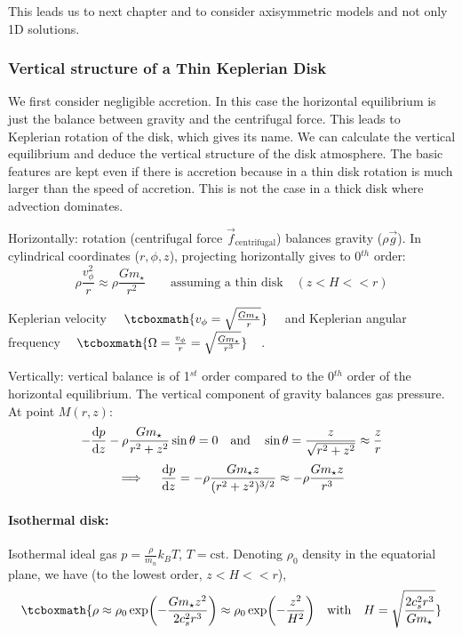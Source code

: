 \documentclass[10pt,a4paper,english]{article}
\let\originalleft\left
\let\originalright\right
\renewcommand{\left}{\mathopen{}\mathclose\bgroup\originalleft}
\renewcommand{\right}{\aftergroup\egroup\originalright}
\begin{document}
This leads us to next chapter and to consider axisymmetric models and not only
1D solutions.

\subsubsection{Vertical structure of a Thin Keplerian Disk}
We first consider negligible accretion. In this case the horizontal equilibrium is just the balance between gravity and the centrifugal force. This leads to Keplerian rotation of the disk, which gives its name. We can calculate the vertical equilibrium and deduce the vertical structure of the disk atmosphere. The basic features are kept even if there is accretion because in a thin disk rotation is much larger than the speed of accretion. This is not the case in a thick disk where advection dominates.


Horizontally: rotation (centrifugal force $\vec{f}_{\text{centrifugal}}$) balances gravity ($\rho \vec{g}$). In cylindrical coordinates ($r, \phi, z$), projecting horizontally gives to 0$^{th}$ order:
\begin{equation}
	\rho \frac{v_\phi^2}{r}\approx \rho\frac{Gm_\star}{r^2} \qquad \text{assuming a thin disk} \quad (z<H<<r)
\end{equation}

Keplerian velocity $\quad\tcboxmath{v_\phi = \sqrt{\frac{Gm_\star}{r}}} \quad$ and Keplerian angular frequency $\quad\tcboxmath{\Omega = \frac{v_\phi}{r} = \sqrt{\frac{Gm_\star}{r^3}}} \quad$.

Vertically: vertical balance is of 1$^{st}$ order compared to the 0$^{th}$ order of the horizontal equilibrium. The vertical component of gravity balances gas pressure. At point $M(r,z)$:
\begin{equation}
-\frac{\mathrm{d} p}{\mathrm{d} z}-\rho \frac{Gm_\star}{r^2+z^2}\sin\theta = 0 \quad \text{and} \quad \sin\theta = \frac{z}{\sqrt{r^2+z^2}} \approx \frac{z}{r}
\end{equation}
\begin{equation}
\implies \quad \frac{\mathrm{d} p}{\mathrm{d} z} = -\rho \frac{G m_\star z}{(r^2+z^2)^{3/2}} \approx -\rho \frac{G m_\star z}{r^3}
\end{equation}

\paragraph{Isothermal disk:} Isothermal ideal gas $p=\frac{\rho}{m_n}k_B T$, $T=\text{cst}$. Denoting $\rho_0$ density in the equatorial plane, we have (to the lowest order, $z<H<<r$),
\begin{equation}
\tcboxmath{\rho \approx \rho_0 \exp \left(-\frac{G m_\star z^2}{2 c_s^2 r^3} \right) \approx \rho_0 \exp \left(-\frac{z^2}{H^2} \right) \quad \text{with} \quad H = \sqrt{\frac{2 c_s^2 r^3}{G m_\star}}}
\end{equation}
\end{document}
